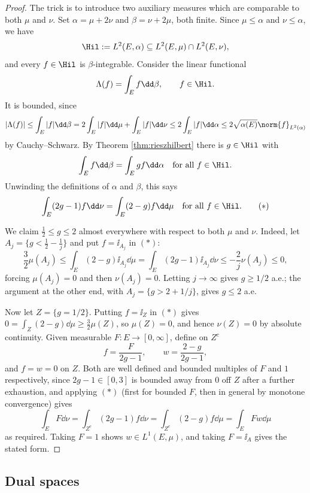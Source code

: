 \begin{proof}
	The trick is to introduce two auxiliary measures which are comparable to both $\mu$ and $\nu$. Set $\alpha = \mu + 2\nu$ and $\beta = \nu + 2\mu$, both finite. Since $\mu \le \alpha$ and $\nu \le \alpha$, we have
	$$\Hil := L^2(E,\alpha) \subseteq L^2(E,\mu) \cap L^2(E,\nu),$$
	and every $f \in \Hil$ is $\beta$-integrable. Consider the linear functional
	$$\Lambda(f) = \int_E f \dd \beta, \qquad f \in \Hil.$$
	It is bounded, since
	$$|\Lambda(f)| \le \int_E |f| \dd \beta = 2\int_E |f| \dd\mu + \int_E |f| \dd\nu \le 2\int_E |f| \dd \alpha \le 2\sqrt{\alpha(E)}\norm{f}_{L^2(\alpha)}$$
	by Cauchy--Schwarz. By Theorem \ref{thm:rieszhilbert} there is $g \in \Hil$ with
	$$\int_E f \dd \beta = \int_E gf \dd \alpha \quad \text{for all } f \in \Hil.$$
	Unwinding the definitions of $\alpha$ and $\beta$, this says
	\begin{equation*}
		\int_E (2g-1) f \dd \nu = \int_E (2 - g) f \dd \mu \quad \text{for all } f \in \Hil. \tag{$\ast$}
	\end{equation*}

	We claim $\tfrac 12 \le g \le 2$ almost everywhere with respect to both $\mu$ and $\nu$. Indeed, let $A_j = \{g < \tfrac 12 - \tfrac 1j\}$ and put $f = \ii_{A_j}$ in $(\ast)$:
	$$\frac{3}{2}\mu(A_j) \le \int_E (2-g)\ii_{A_j} \dd \mu = \int_E (2g-1)\ii_{A_j}\dd\nu \le -\frac{2}{j}\nu(A_j) \le 0,$$
	forcing $\mu(A_j) = 0$ and then $\nu(A_j) = 0$. Letting $j \to \infty$ gives $g \ge 1/2$ a.e.; the argument at the other end, with $A_j = \{g > 2 + 1/j\}$, gives $g \le 2$ a.e.

	Now let $Z = \{g = 1/2\}$. Putting $f = \ii_Z$ in $(\ast)$ gives $0 = \int_Z (2-g) \dd\mu \ge \tfrac 32 \mu(Z)$, so $\mu(Z) = 0$, and hence $\nu(Z) = 0$ by absolute continuity. Given measurable $F : E \to [0,\infty]$, define on $Z^c$
	$$f = \frac{F}{2g-1}, \qquad w = \frac{2-g}{2g-1},$$
	and $f = w = 0$ on $Z$. Both are well defined and bounded multiples of $F$ and $1$ respectively, since $2g - 1 \in [0,3]$ is bounded away from $0$ off $Z$ after a further exhaustion, and applying $(\ast)$ (first for bounded $F$, then in general by monotone convergence) gives
	$$\int_E F \dd \nu = \int_{Z^c} (2g-1)f \dd\nu = \int_{Z^c}(2-g) f \dd\mu = \int_E Fw \dd\mu$$
	as required. Taking $F = 1$ shows $w \in L^1(E,\mu)$, and taking $F = \ii_A$ gives the stated form.
\end{proof}

\subsection{Dual spaces}

